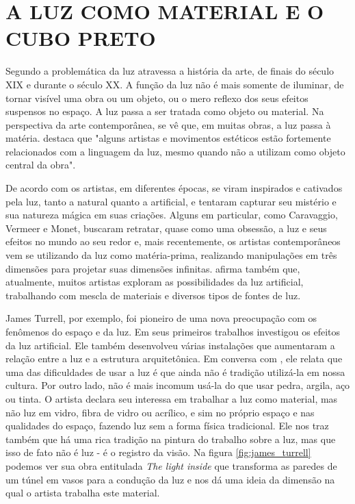 \chapter{A LUZ COMO MATERIAL E O CUBO PRETO}

Segundo  a problemática da luz atravessa a história da arte, de finais do século XIX e durante o século XX. A função da luz não é mais somente de iluminar, de tornar visível uma obra ou um objeto, ou o mero reflexo dos seus efeitos suspensos no espaço. A luz passa a ser tratada como objeto ou material. Na perspectiva da arte contemporânea, se vê que, em muitas obras, a luz passa à matéria.  destaca que "alguns artistas e movimentos estéticos estão fortemente relacionados com a linguagem da luz, mesmo quando não a utilizam como objeto central da obra". 

De acordo com  os artistas, em diferentes épocas, se viram inspirados e cativados pela luz, tanto a natural quanto a artificial, e tentaram capturar seu mistério e sua natureza mágica em suas criações. Alguns em particular, como Caravaggio, Vermeer e Monet, buscaram retratar, quase como uma obsessão, a luz e seus efeitos no mundo ao seu redor e, mais recentemente, os artistas contemporâneos vem se utilizando da luz como matéria-prima, realizando manipulações em três dimensões para projetar suas dimensões infinitas.  afirma também que, atualmente, muitos artistas exploram as possibilidades da luz artificial, trabalhando com mescla de materiais e diversos tipos de fontes de luz. 

James Turrell, por exemplo, foi pioneiro de uma nova preocupação com os fenômenos do espaço e da luz. Em seus primeiros trabalhos investigou os efeitos da luz artificial. Ele também desenvolveu várias instalações que aumentaram a relação entre a luz e a estrutura arquitetônica. Em conversa com , ele relata que uma das dificuldades de usar a luz é que ainda não é tradição utilizá-la em nossa cultura. Por outro lado, não é mais incomum usá-la do que usar pedra, argila, aço ou tinta. O artista declara seu interessa em trabalhar a luz como material, mas não luz em vidro, fibra de vidro ou acrílico, e sim no próprio espaço e nas qualidades do espaço, fazendo luz sem a forma física tradicional. Ele nos traz também que há uma rica tradição na pintura do trabalho sobre a luz, mas que isso de fato não é luz - é o registro da visão. Na figura \ref{fig:james_turrell} podemos ver sua obra entitulada \textit{The light inside} que transforma as paredes de um túnel em vasos para a condução da luz e nos dá uma ideia da dimensão na qual o artista trabalha este material. 


